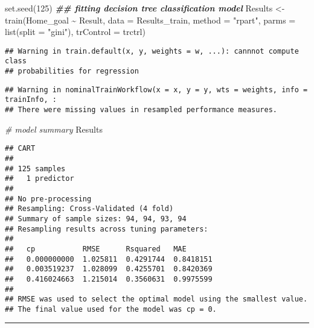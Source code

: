 \documentclass[
]{article}
\newenvironment{Shaded}{\begin{snugshade}}{\end{snugshade}}
\newcommand{\AttributeTok}[1]{\textcolor[rgb]{0.77,0.63,0.00}{#1}}
\newcommand{\CommentTok}[1]{\textcolor[rgb]{0.56,0.35,0.01}{\textit{#1}}}
\newcommand{\DecValTok}[1]{\textcolor[rgb]{0.00,0.00,0.81}{#1}}
\newcommand{\DocumentationTok}[1]{\textcolor[rgb]{0.56,0.35,0.01}{\textbf{\textit{#1}}}}
\newcommand{\FunctionTok}[1]{\textcolor[rgb]{0.00,0.00,0.00}{#1}}
\newcommand{\NormalTok}[1]{#1}
\newcommand{\OtherTok}[1]{\textcolor[rgb]{0.56,0.35,0.01}{#1}}
\newcommand{\SpecialCharTok}[1]{\textcolor[rgb]{0.00,0.00,0.00}{#1}}
\newcommand{\StringTok}[1]{\textcolor[rgb]{0.31,0.60,0.02}{#1}}
\begin{document}
\begin{Shaded}
\begin{Highlighting}[]
\FunctionTok{set.seed}\NormalTok{(}\DecValTok{125}\NormalTok{)}
\DocumentationTok{\#\# fitting decision tree classification model}
\NormalTok{Results }\OtherTok{\textless{}{-}} \FunctionTok{train}\NormalTok{(Home\_goal }\SpecialCharTok{\textasciitilde{}}\NormalTok{ Result,}
                         \AttributeTok{data =}\NormalTok{ Results\_train, }
                         \AttributeTok{method =} \StringTok{"rpart"}\NormalTok{,}
                         \AttributeTok{parms  =} \FunctionTok{list}\NormalTok{(}\AttributeTok{split =} \StringTok{"gini"}\NormalTok{), }
                         \AttributeTok{trControl =}\NormalTok{ trctrl)}
\end{Highlighting}
\end{Shaded}

\begin{verbatim}
## Warning in train.default(x, y, weights = w, ...): cannnot compute class
## probabilities for regression
\end{verbatim}

\begin{verbatim}
## Warning in nominalTrainWorkflow(x = x, y = y, wts = weights, info = trainInfo, :
## There were missing values in resampled performance measures.
\end{verbatim}

\begin{Shaded}
\begin{Highlighting}[]
\CommentTok{\# model summary}
\NormalTok{Results}
\end{Highlighting}
\end{Shaded}

\begin{verbatim}
## CART 
## 
## 125 samples
##   1 predictor
## 
## No pre-processing
## Resampling: Cross-Validated (4 fold) 
## Summary of sample sizes: 94, 94, 93, 94 
## Resampling results across tuning parameters:
## 
##   cp           RMSE      Rsquared   MAE      
##   0.000000000  1.025811  0.4291744  0.8418151
##   0.003519237  1.028099  0.4255701  0.8420369
##   0.416024663  1.215014  0.3560631  0.9975599
## 
## RMSE was used to select the optimal model using the smallest value.
## The final value used for the model was cp = 0.
\end{verbatim}

\begin{center}\rule{0.5\linewidth}{0.5pt}\end{center}
\end{document}
